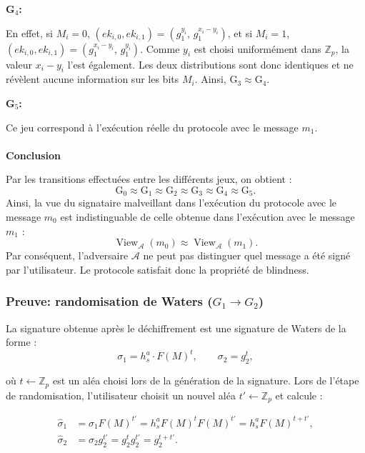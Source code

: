 \noindent\textbf{G$_4$:}

En effet, si $M_i=0$,
$(ek_{i,0},ek_{i,1})=\left(g_1^{y_i},\,g_1^{x_i-y_i}\right)$,
et si $M_i=1$,
$(ek_{i,0},ek_{i,1})=\left(g_1^{x_i-y_i},\,g_1^{y_i}\right).$
Comme $y_i$ est choisi uniformément dans $\mathbb{Z}_p$, la valeur $x_i-y_i$ l'est également. Les deux distributions sont donc identiques et ne révèlent aucune information sur les bits $M_i$. Ainsi,
$\text{G}_3 \approx \text{G}_4$.


\noindent\textbf{G$_5$:}

Ce jeu correspond à l'exécution réelle du protocole avec le message $m_1$.\\\\

\noindent\textbf{Conclusion}

Par les transitions effectuées entre les différents jeux, on obtient :
\[
\text{G}_0 \approx \text{G}_1 \approx \text{G}_2 \approx \text{G}_3 \approx \text{G}_4 \approx \text{G}_5.
\]
Ainsi, la vue du signataire malveillant dans l'exécution du protocole avec le message $m_0$ est indistinguable de celle obtenue dans l'exécution avec le message $m_1$ :
\[
\operatorname{View}_{\mathcal{A}}(m_0) \approx \operatorname{View}_{\mathcal{A}}(m_1).
\]
Par conséquent, l'adversaire $\mathcal{A}$ ne peut pas distinguer quel message a été signé par l'utilisateur. Le protocole satisfait donc la propriété de blindness.


\subsubsection{Preuve: randomisation de Waters ($G_1 \rightarrow G_2$)}
\label{sec:randomisation-waters}

La signature obtenue après le déchiffrement est une signature de Waters
de la forme :
\[
\sigma_1 = h_s^a \cdot F(M)^t,
\qquad
\sigma_2 = g_2^t,
\]

où $t\leftarrow\mathbb{Z}_p$ est un aléa choisi lors de la génération de la
signature.
Lors de l'étape de randomisation, l'utilisateur choisit un nouvel aléa
$t'\leftarrow\mathbb{Z}_p$ et calcule :

\[
\begin{aligned}
\widehat{\sigma}_1 &= \sigma_1 F(M)^{t'}
= h_s^a F(M)^t F(M)^{t'}
= h_s^a F(M)^{t+t'},\\
\widehat{\sigma}_2 &= \sigma_2 g_2^{t'}
= g_2^t g_2^{t'}
= g_2^{t+t'}.
\end{aligned}
\]

